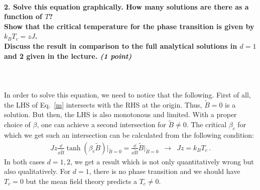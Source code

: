 \paragraph{2. Solve this equation graphically. How many solutions are there as a function of $T$? \\
Show that the critical temperature for the phase transition is given by $k_BT_c = zJ$. \\
Discuss the result in comparison to the full analytical solutions in $d = 1$ and 2 given in the lecture. \textit{(1 point)}
} \ \\
\\
In order to solve this equation, we need to notice that the following. First of all, the LHS of Eq.~\eqref{m} 
intersects with the RHS at the origin. Thus, $\tilde{B}=0$ is a solution. But then, the LHS is also monotonous and limited. 
With a proper choice of $\beta$, one can achieve a second intersection for $\tilde{B}\neq 0$. The critical $\beta_c$ for which 
we get such an intersection can be calculated from the following condition:
\begin{align}
	\label{m}
	J z \frac{\dd}{\dd \tilde{B}}\tanh(\beta_c\tilde{B}) \Big\vert_{\tilde{B}=0} = \frac{\dd}{\dd \tilde{B}}\tilde{B} \Big\vert_{\tilde{B}=0} 
	\, \, \, \rightarrow \, \, \, Jz = k_B T_c \,.
\end{align}
In both cases $d=1,2$, we get a result which is not only quantitatively wrong but also qualitatively. For $d=1$, there is no phase 
transition and we should have $T_c=0$ but the mean field theory predicts a $T_c\neq 0$.
